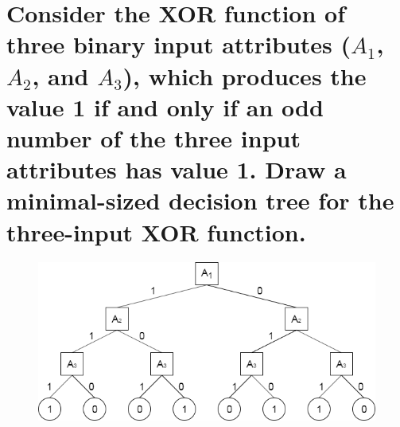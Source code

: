 \documentclass{article}
\begin{document}
\section{Consider the XOR function of three binary input attributes ($A_1$, $A_2$, and $A_3$), which produces the value 1 if and only if an odd number of the three input attributes has value 1. Draw a minimal-sized decision tree for the three-input XOR function.}
	\begin{figure}[h!]
	\centering
	\includegraphics[width=\textwidth]{decision_tree.png}
	\end{figure}
\end{document}
